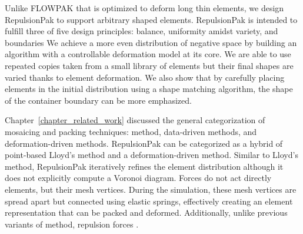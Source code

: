 \newtext
{
Unlike FLOWPAK that is optimized to deform long thin elements, 
we design RepulsionPak to support arbitrary shaped elements.
RepulsionPak is intended to fulfill three of five design principles:
balance, uniformity amidst variety, and boundaries  
We achieve a more even distribution of negative space by building an algorithm with a controllable deformation model at its core. 
We are able to use repeated copies taken from a small library of elements 
but their final shapes are varied thanks to element deformation.
We also show that by carefully placing elements in the initial distribution using a shape matching algorithm, 
the shape of the container boundary can be more emphasized.
}

\newtext
{
Chapter~\ref{chapter_related_work} discussed the general categorization of mosaicing and packing techniques: 
 method, data-driven methods, and deformation-driven methods.
RepulsionPak can be categorized as a hybrid of point-based Lloyd's method and a deformation-driven method.
Similar to Lloyd's method, RepulsionPak iteratively refines the element distribution although it does not explicitly compute a Voronoi diagram.
Forces do not act directly  elements, but their mesh vertices.
During the simulation, these mesh vertices are spread apart but  connected using elastic springs,
effectively creating an element representation that can be packed and deformed.
Additionally, unlike previous variants of  method, 
repulsion forces . 
}





